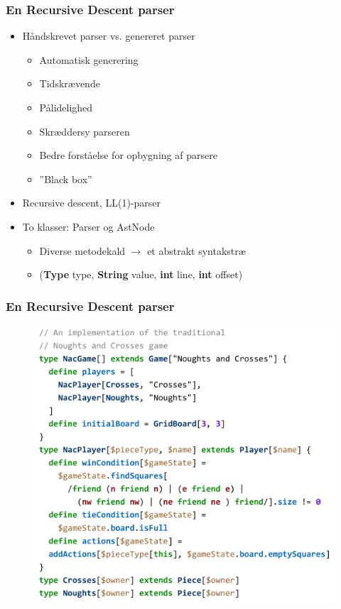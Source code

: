 \begin{frame}
  \frametitle{En Recursive Descent parser}

  \begin{itemize}
    \item Håndskrevet parser vs. genereret parser
      \begin{itemize}
	\item Automatisk generering
	\item Tidskrævende
	\item Pålidelighed
	\item Skræddersy parseren
	\item Bedre forståelse for opbygning af parsere
	\item ''Black box''
      \end{itemize}
    \item Recursive descent, LL(1)-parser
    \item To klasser: Parser og AstNode
      \begin{itemize}
	\item Diverse metodekald $\rightarrow$ et abstrakt syntakstræ
	\item (\textbf{Type} type, \textbf{String} value, \textbf{int} line,
	  \textbf{int} offset)
      \end{itemize}
  \end{itemize}

\end{frame}

\begin{frame}
  \frametitle{En Recursive Descent parser}

  \begin{figure}
    \includegraphics[width=0.6\linewidth]{billeder/krydsogbolle}
  \end{figure}

\end{frame}
